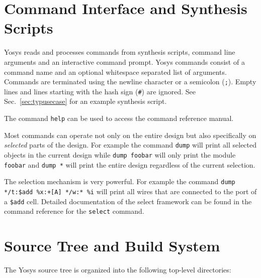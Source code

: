 \section{Command Interface and Synthesis Scripts}

Yosys reads and processes commands from synthesis scripts, command line arguments and
an interactive command prompt. Yosys commands consist of a command name and an optional
whitespace separated list of arguments. Commands are terminated using the newline character
or a semicolon ({\tt ;}). Empty lines and lines starting with the hash sign ({\tt \#}) are ignored.
See Sec.~\ref{sec:typusecase} for an example synthesis script.

The command {\tt help} can be used to access the command reference manual.

Most commands can operate not only on the entire design but also specifically on {\it selected}
parts of the design. For example the command {\tt dump} will print all selected objects
in the current design while {\tt dump foobar} will only print the module {\tt foobar}
and {\tt dump *} will print the entire design regardless of the current selection.

The selection mechanism is very powerful. For example the command {\tt dump */t:\$add
\%x:+[A] */w:* \%i} will print all wires that are connected to the  port of
a {\tt \$add} cell.  Detailed documentation of the select framework can be
found in the command reference for the {\tt select} command.

\section{Source Tree and Build System}

The Yosys source tree is organized into the following top-level directories:

